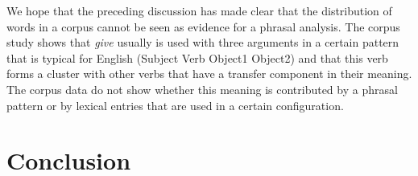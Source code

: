\begin{exe}
\begin{xlist}[iv.]
\begin{exe}
\begin{xlist}[iv.]

\noindent
We hope that the preceding discussion has made clear that the distribution of words in a corpus cannot
be seen as evidence for a phrasal analysis. The corpus study shows that \emph{give} usually is used
with three arguments in a certain pattern that is typical for English (Subject Verb Object1 Object2)
and that this verb forms a cluster with other verbs that have a transfer component in their meaning.
The corpus data do not show whether this meaning is contributed by a phrasal pattern or by lexical
entries that are used in a certain configuration.



\section{Conclusion}

%


\end{xlist}
\end{exe}
\end{xlist}
\end{exe}
